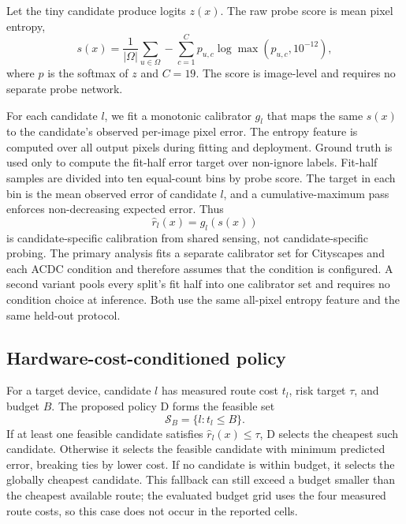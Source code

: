 \documentclass[a4paper,review,12pt]{elsarticle}
\begin{document}
Let the tiny candidate produce logits $z(x)$. The raw probe score is mean pixel entropy,
\begin{equation}
s(x)=\frac{1}{|\Omega|}\sum_{u\in\Omega}-\sum_{c=1}^{C}p_{u,c}\log\max(p_{u,c},10^{-12}),
\label{eq:entropy}
\end{equation}
where $p$ is the softmax of $z$ and $C=19$. The score is image-level and requires no separate probe network.

For each candidate $l$, we fit a monotonic calibrator $g_l$ that maps the same $s(x)$ to the candidate's observed per-image pixel error. The entropy feature is computed over all output pixels during fitting and deployment. Ground truth is used only to compute the fit-half error target over non-ignore labels. Fit-half samples are divided into ten equal-count bins by probe score. The target in each bin is the mean observed error of candidate $l$, and a cumulative-maximum pass enforces non-decreasing expected error. Thus
\begin{equation}
\widehat{r}_l(x)=g_l(s(x))
\label{eq:risk}
\end{equation}
is candidate-specific calibration from shared sensing, not candidate-specific probing. The primary analysis fits a separate calibrator set for Cityscapes and each ACDC condition and therefore assumes that the condition is configured. A second variant pools every split's fit half into one calibrator set and requires no condition choice at inference. Both use the same all-pixel entropy feature and the same held-out protocol.

\subsection{Hardware-cost-conditioned policy}
\label{sec:policy}

For a target device, candidate $l$ has measured route cost $t_l$, risk target $\tau$, and budget $B$. The proposed policy D forms the feasible set
\begin{equation}
\mathcal{S}_B=\{l:t_l\leq B\}.
\label{eq:feasible}
\end{equation}
If at least one feasible candidate satisfies $\widehat{r}_l(x)\leq\tau$, D selects the cheapest such candidate. Otherwise it selects the feasible candidate with minimum predicted error, breaking ties by lower cost. If no candidate is within budget, it selects the globally cheapest candidate. This fallback can still exceed a budget smaller than the cheapest available route; the evaluated budget grid uses the four measured route costs, so this case does not occur in the reported cells.
\end{document}

